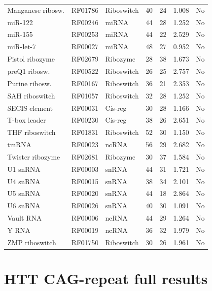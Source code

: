 \documentclass[11pt]{article}
\begin{document}
\begin{table}[h]
\begin{tabular}{@{}lllcccc@{}}
Manganese ribosw.   & RF01786 & Riboswitch  & 40 & 24 & 1.008 & No \\
miR-122             & RF00246 & miRNA       & 44 & 28 & 1.252 & No \\
miR-155             & RF00253 & miRNA       & 44 & 22 & 2.529 & No \\
miR-let-7           & RF00027 & miRNA       & 48 & 27 & 0.952 & No \\
Pistol ribozyme     & RF02679 & Ribozyme    & 28 & 38 & 1.673 & No \\
preQ1 ribosw.       & RF00522 & Riboswitch  & 26 & 25 & 2.757 & No \\
Purine ribosw.      & RF00167 & Riboswitch  & 36 & 21 & 2.353 & No \\
SAH riboswitch      & RF01057 & Riboswitch  & 32 & 28 & 1.252 & No \\
SECIS element       & RF00031 & Cis-reg     & 30 & 28 & 1.166 & No \\
T-box leader        & RF00230 & Cis-reg     & 38 & 26 & 2.651 & No \\
THF riboswitch      & RF01831 & Riboswitch  & 52 & 30 & 1.150 & No \\
tmRNA               & RF00023 & ncRNA       & 56 & 29 & 2.682 & No \\
Twister ribozyme    & RF02681 & Ribozyme    & 30 & 37 & 1.584 & No \\
U1 snRNA            & RF00003 & snRNA       & 44 & 31 & 1.721 & No \\
U4 snRNA            & RF00015 & snRNA       & 38 & 34 & 2.101 & No \\
U5 snRNA            & RF00020 & snRNA       & 44 & 18 & 2.864 & No \\
U6 snRNA            & RF00026 & snRNA       & 40 & 30 & 1.091 & No \\
Vault RNA           & RF00006 & ncRNA       & 44 & 29 & 1.264 & No \\
Y RNA               & RF00019 & ncRNA       & 36 & 32 & 1.979 & No \\
ZMP riboswitch      & RF01750 & Riboswitch  & 30 & 26 & 1.961 & No \\
\bottomrule
\end{tabular}
\end{table}


\section{HTT CAG-repeat full results}
\label{sec:appendix_htt}
\end{document}
